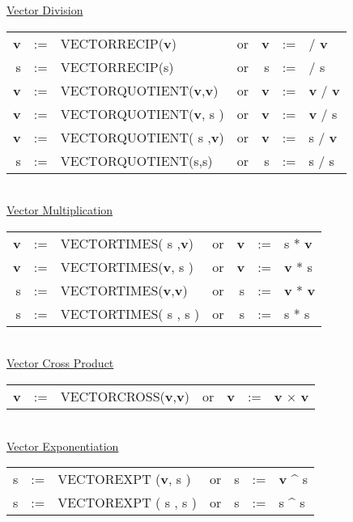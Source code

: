 \underline{Vector Division}\\
  
\begin{tabular}{rclcrcl}
{\bf v} &:=& VECTORRECIP({\bf v})  &{\rm or}& {\bf v} &:=&  /
{\bf v} \\
 s  &:=& VECTORRECIP(s)  &{\rm or} &      s  &:=&  /       s  \\
{\bf v} &:=& VECTORQUOTIENT({\bf v},{\bf v})  &{\rm or }& {\bf v} &:=&
{\bf v} /  {\bf v} \\
{\bf v} &:=& VECTORQUOTIENT({\bf v},    s  )  &{\rm or }& {\bf v} &:=&
{\bf v} /     s    \\
{\bf v} &:=& VECTORQUOTIENT(   s   ,{\bf v})  &{\rm or }& {\bf v} &:=&
   s    /  {\bf v} \\
     s  &:=& VECTORQUOTIENT(s,s)  &{\rm or }&      s  &:=&  s / s
       \\
\end{tabular} \\

\underline{Vector Multiplication}\\
 
\begin{tabular}{rclcrcl}
{\bf v} &:=& VECTORTIMES(   s   ,{\bf v})  &{\rm or }& {\bf v} &:=&
s    *  {\bf v} \\
{\bf v} &:=& VECTORTIMES({\bf v},   s   )  &{\rm or }& {\bf v} &:=& {\bf
 v}  *     s    \\
   s    &:=& VECTORTIMES({\bf v},{\bf v})  &{\rm or }&    s    &:=& {\bf
 v}  *  {\bf v} \\
   s    &:=& VECTORTIMES(   s   ,   s   )  &{\rm or }&    s    &:=&
s    *     s    \\
\end{tabular} \\

\underline{Vector Cross Product} \\
  
\begin{tabular}{rclcrcl}
{\bf v} &:=& VECTORCROSS({\bf v},{\bf v})  &{\rm or }& {\bf v} &:=& {\bf
 v} $\times$   {\bf v} \\
\end{tabular} \\

\underline{Vector Exponentiation}\\
 
\begin{tabular}{rclcrcl}
   s    &:=& VECTOREXPT ({\bf v},   s   )  &{\rm or }&    s    &:=& {\bf
 v}  \^{} s   \\
   s    &:=& VECTOREXPT (   s   ,   s   )  &{\rm or }&    s    &:=&    s
     \^{} s   \\
\end{tabular} \\

